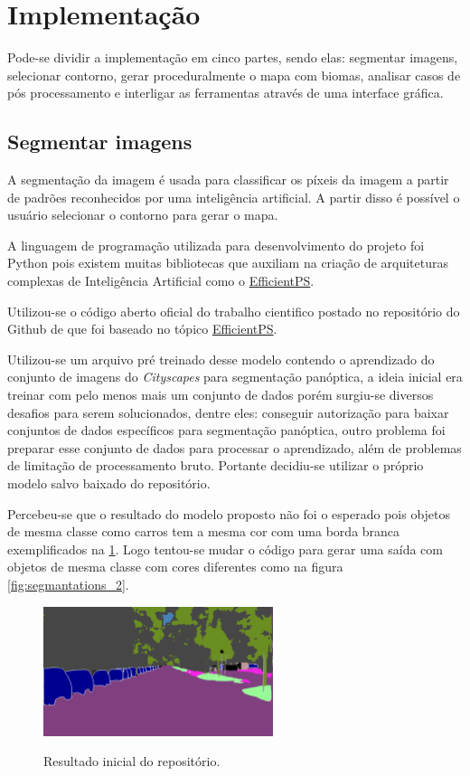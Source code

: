 \section{Implementação}

Pode-se dividir a implementação em cinco partes, sendo elas: segmentar imagens, selecionar contorno, gerar proceduralmente o mapa com biomas, analisar casos de pós processamento e interligar as ferramentas através de uma interface gráfica.

\subsection{Segmentar imagens}

A segmentação da imagem é usada para classificar os píxeis da imagem a partir de padrões reconhecidos por uma inteligência artificial. A partir disso é possível o usuário selecionar o contorno para gerar o mapa.

A linguagem de programação utilizada para desenvolvimento do projeto foi Python pois existem muitas bibliotecas que auxiliam na criação de arquiteturas complexas de Inteligência Artificial como o \hyperref[sec:EfficientPS]{EfficientPS}.

Utilizou-se o código aberto oficial do trabalho cientifico postado no repositório do Github de  que foi baseado no tópico \hyperref[sec:EfficientPS]{EfficientPS}.

Utilizou-se um arquivo pré treinado desse modelo contendo o aprendizado do conjunto de imagens do \textit{Cityscapes} para segmentação panóptica, a ideia inicial era treinar com pelo menos mais um conjunto de dados porém surgiu-se diversos desafios para serem solucionados, dentre eles: conseguir autorização para baixar conjuntos de dados específicos para segmentação panóptica, outro problema foi preparar esse conjunto de dados para processar o aprendizado, além de problemas de limitação de processamento bruto. Portante decidiu-se utilizar o próprio modelo salvo baixado do repositório.

Percebeu-se que o resultado do modelo proposto não foi o esperado pois objetos de mesma classe como carros tem a mesma cor com uma borda branca exemplificados na \cref{fig:resultado_inicial}. Logo tentou-se mudar o código para gerar uma saída com objetos de mesma classe com cores diferentes como na figura \cref{fig:segmantations_2}.

\begin{figure}[!ht]
	\centering
    \caption{Resultado inicial do repositório.}
	\includegraphics[width=0.6\textwidth]{figures/resultado_primario.png}
	\label{fig:resultado_inicial}
\end{figure}


